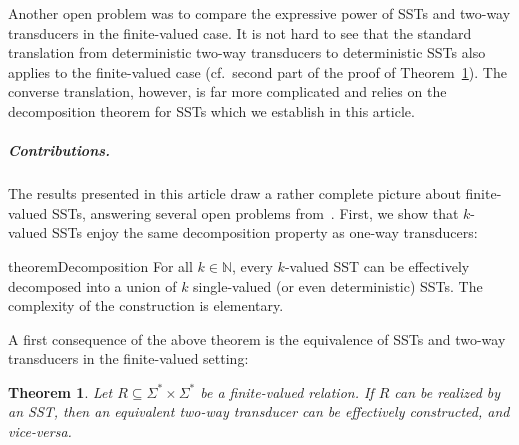 \documentclass{article}
\newtheorem{theorem}{Theorem}\newtheorem{lemma}[theorem]{Lemma}\newtheorem{proposition}[theorem]{Proposition}\newtheorem{corollary}[theorem]{Corollary}\newtheorem{definition}[theorem]{Definition}\newtheorem{claim}[theorem]{Claim}\newtheorem{remark}[theorem]{Remark}\newtheorem{example}[theorem]{Example}\newtheorem*{claim*}{Claim}
\newcommand{\RestateRemark}[1]{{\normalfont\bfseries #1}}
\newcommand{\RestateInit}[1]{\newcommand{#1}{}}
\newcommand{\alp}{\Sigma}
\begin{document}
Another open problem was to compare the expressive power of SSTs and 
two-way transducers in the finite-valued case.
It is  not hard to see that the standard translation from deterministic
two-way transducers to deterministic SSTs also applies to the
finite-valued case (cf.~second part of the proof of Theorem~\ref{thm:finval-SST-2FT}).
The converse translation, however, is far more complicated and relies on
the decomposition theorem for SSTs which we establish in this article.



\medskip
\subparagraph*{\bf Contributions.} 
The results presented in this article  draw a
rather complete picture about 
finite-valued SSTs, answering several open problems from~\cite{DBLP:conf/icalp/AlurD11}.
First, we show that $k$-valued SSTs enjoy the same decomposition property as
one-way transducers:  
\RestateInit{\restateDecomposition}
\begin{restatable}{theorem}{Decomposition}
\label{thm:FiniteValuedToDecomposition}\RestateRemark{\restateDecomposition}
    For all $k \in \mathbb{N}$, 
    every $k$-valued SST can be effectively decomposed into a union of
    $k$ single-valued (or even deterministic) SSTs.
    The complexity of the construction is elementary.
\end{restatable}

A first consequence of the above theorem is the equivalence of
SSTs and two-way transducers in the finite-valued setting:


    
\begin{theorem}\label{thm:finval-SST-2FT}
  Let $R\subseteq \alp^*\times \alp^*$ be a finite-valued relation.
  If $R$ can be realized by an SST, then an equivalent 
  two-way transducer can be effectively constructed, and vice-versa.
\end{theorem}
\end{document}
